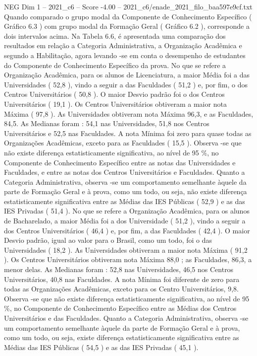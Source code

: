 \begin{textsample}{NEG Dim 1 – 2021\_c6 – Score -4.00 – 2021\_c6/enade\_2021\_filo\_baa597e9cf.txt}
Quando comparado o grupo modal da Componente de Conhecimento Específico ( Gráfico 6.3 ) com grupo modal da Formação Geral ( Gráfico 6.2 ), corresponde a dois intervalos acima.
Na Tabela 6.6, é apresentada uma comparação dos resultados em relação a Categoria Administrativa, a Organização Acadêmica e segundo a Habilitação, agora levando -se em conta o desempenho de estudantes do Componente de Conhecimento Específico da prova.
No que se refere a Organização Acadêmica, para os alunos de Licenciatura, a maior Média foi a das Universidades ( 52,8 ), vindo a seguir a das Faculdades ( 51,2 ) e, por fim, o dos Centros Universitários ( 50,8 ).
O maior Desvio padrão foi o dos Centros Universitários ( 19,1 ).
Os Centros Universitários obtiveram a maior nota Máxima ( 97,8 ).
As Universidades obtiveram nota Máxima 96,3, e as Faculdades, 84,5.
As Medianas foram : 54,1 nas Universidades, 51,8 nos Centros Universitários e 52,5 nas Faculdades.
A nota Mínima foi zero para quase todas as Organizações Acadêmicas, exceto para as Faculdades ( 15,5 ).
Observa -se que não existe diferença estatisticamente significativa, ao nível de 95 \%, no Componente de Conhecimento Específico entre as notas das Universidades e Faculdades, e entre as notas dos Centros Universitários e Faculdades.
Quanto a Categoria Administrativa, observa -se um comportamento semelhante àquele da parte de Formação Geral e à prova, como um todo, ou seja, não existe diferença estatisticamente significativa entre as Médias das IES Públicas ( 52,9 ) e as das IES Privadas ( 51,4 ).
No que se refere a Organização Acadêmica, para os alunos de Bacharelado, a maior Média foi a dos Universidade ( 51,2 ), vindo a seguir a dos Centros Universitários ( 46,4 ) e, por fim, a das Faculdades ( 42,4 ).
O maior Desvio padrão, igual ao valor para o Brasil, como um todo, foi o das Universidades ( 18,2 ).
As Universidades obtiveram a maior nota Máxima ( 91,2 ).
Os Centros Universitários obtiveram nota Máxima 88,0 ; as Faculdades, 86,3, a menor delas.
As Medianas foram : 52,8 nas Universidades, 46,5 nos Centros Universitários, 40,8 nas Faculdades.
A nota Mínima foi diferente de zero para todas as Organizações Acadêmicas, exceto para os Centro Universitários, 9,8.
Observa -se que não existe diferença estatisticamente significativa, ao nível de 95 \%, no Componente de Conhecimento Específico entre as Médias dos Centros Universitários e das Faculdades.
Quanto a Categoria Administrativa, observa -se um comportamento semelhante àquele da parte de Formação Geral e à prova, como um todo, ou seja, existe diferença estatisticamente significativa entre as Médias das IES Públicas ( 54,5 ) e as das IES Privadas ( 45,1 ).

\end{textsample}
